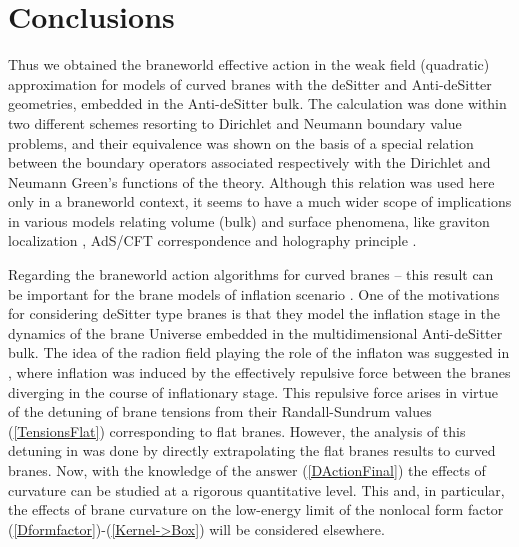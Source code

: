 \documentclass[a4paper,12pt]{article}
\begin{document}
\section{Conclusions}
\hspace{\parindent}Thus we obtained the braneworld effective
action in the weak field (quadratic) approximation for models of
curved branes with the deSitter and Anti-deSitter geometries,
embedded in the Anti-deSitter bulk. The calculation was done
within two different schemes resorting to Dirichlet and Neumann
boundary value problems, and their equivalence was shown on the
basis of a special relation between the boundary operators
associated respectively with the Dirichlet and Neumann Green's
functions of the theory. Although this relation was used here only
in a braneworld context, it seems to have a much wider scope of
implications in various models relating volume (bulk) and surface
phenomena, like graviton localization \cite{RS}, AdS/CFT
correspondence and holography principle
\cite{BalKraLa,Gubser,holography,SkendSol,SachsSol}.

Regarding the braneworld action algorithms for curved branes --
this result can be important for the brane models of inflation
scenario \cite{Tye,brane,BWEA}. One of the motivations for
considering deSitter type branes is that they model the inflation
stage in the dynamics of the brane Universe embedded in the
multidimensional Anti-deSitter bulk. The idea of the radion field
playing the role of the inflaton was suggested in \cite{brane},
where inflation was induced by the effectively repulsive force
between the branes diverging in the course of inflationary stage.
This repulsive force arises in virtue of the detuning of brane
tensions from their Randall-Sundrum values (\ref{TensionsFlat})
corresponding to flat branes. However, the analysis of this
detuning in \cite{brane,BWEA} was done by directly extrapolating
the flat branes results to curved branes. Now, with the knowledge
of the answer (\ref{DActionFinal}) the effects of curvature can be
studied at a rigorous quantitative level. This and, in particular,
the effects of brane curvature on the low-energy limit of the
nonlocal form factor (\ref{Dformfactor})-(\ref{Kernel->Box}) will
be considered elsewhere.
\end{document}
